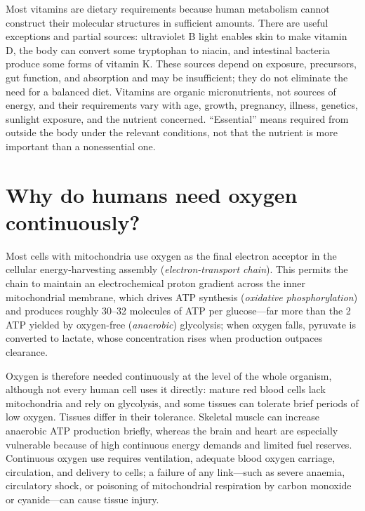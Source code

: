 \documentclass[11pt,oneside]{report}
\begin{document}
Most vitamins are dietary requirements because human metabolism cannot
construct their molecular structures in sufficient amounts. There are useful
exceptions and partial sources: ultraviolet B light enables skin to make
vitamin D, the body can convert some tryptophan to niacin, and intestinal
bacteria produce some forms of vitamin K. These sources depend on exposure,
precursors, gut function, and absorption and may be insufficient; they do not
eliminate the need for a balanced diet. Vitamins are organic micronutrients,
not sources of energy, and their requirements vary with age, growth, pregnancy,
illness, genetics, sunlight exposure, and the nutrient concerned. ``Essential''
means required from outside the body under the relevant conditions, not that
the nutrient is more important than a nonessential one.

\section{Why do humans need oxygen continuously?}

Most cells with mitochondria use oxygen as the final electron acceptor in the
cellular energy-harvesting assembly (\emph{electron-transport chain}). This
permits the chain to maintain an electrochemical proton gradient across the inner
mitochondrial membrane, which drives ATP synthesis (\emph{oxidative
phosphorylation}) and produces roughly 30--32 molecules of ATP per glucose—far
more than the 2 ATP yielded by oxygen-free (\emph{anaerobic}) glycolysis; when
oxygen falls, pyruvate is converted to lactate, whose concentration rises when
production outpaces clearance.

Oxygen is therefore needed continuously at the level of the whole organism,
although not every human cell uses it directly: mature red blood cells lack
mitochondria and rely on glycolysis, and some tissues can tolerate brief
periods of low oxygen. Tissues differ in their tolerance. Skeletal muscle can
increase anaerobic ATP production briefly, whereas the brain and heart are
especially vulnerable because of high continuous energy demands and limited
fuel reserves. Continuous oxygen use requires ventilation, adequate blood
oxygen carriage, circulation, and delivery to cells; a failure of any link—such
as severe anaemia, circulatory shock, or poisoning of mitochondrial respiration
by carbon monoxide or cyanide—can cause tissue injury.
\end{document}
